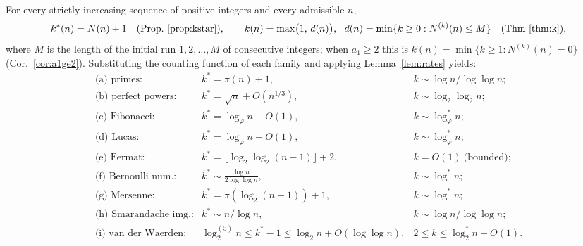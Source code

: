 \documentclass[12pt]{article}
\theoremstyle{definition}
\begin{document}
For every strictly increasing sequence of positive integers and every admissible $n$,
\[
  k^*(n)=N(n)+1\quad(\text{Prop.~\ref{prop:kstar}}),\qquad
  k(n)=\max\bigl(1,\,d(n)\bigr),\ \ d(n)=\min\{k\ge0:N^{(k)}(n)\le M\}\quad(\text{Thm~\ref{thm:k}}),
\]
where $M$ is the length of the initial run $1,2,\dots,M$ of consecutive integers;
when $a_1\ge2$ this is $k(n)=\min\{k\ge1:N^{(k)}(n)=0\}$
(Cor.~\ref{cor:a1ge2}). Substituting the counting function of each family and applying
Lemma~\ref{lem:rates} yields:
\[
\begin{array}{lll}
\text{(a) primes:} & k^*=\pi(n)+1, & k\sim \log n/\log\log n;\\
\text{(b) perfect powers:} & k^*=\sqrt n+O(n^{1/3}), & k\sim\log_2\log_2 n;\\
\text{(c) Fibonacci:} & k^*=\log_\varphi n+O(1), & k\sim\log^*_\varphi n;\\
\text{(d) Lucas:} & k^*=\log_\varphi n+O(1), & k\sim\log^*_\varphi n;\\
\text{(e) Fermat:} & k^*=\lfloor\log_2\log_2(n-1)\rfloor+2, & k=O(1)\ \text{(bounded)};\\
\text{(f) Bernoulli num.:} & k^*\sim \tfrac{\log n}{2\log\log n}, & k\sim\log^* n;\\
\text{(g) Mersenne:} & k^*=\pi(\log_2(n+1))+1, & k\sim\log^* n;\\
\text{(h) Smarandache img.:} & k^*\sim n/\log n, & k\sim\log n/\log\log n;\\
\text{(i) van der Waerden:} & \log^{(5)}_2 n\le k^*-1\le\log_2 n+O(\log\log n), & 2\le k\le\log^*_2 n+O(1).
\end{array}
\]
\end{document}
